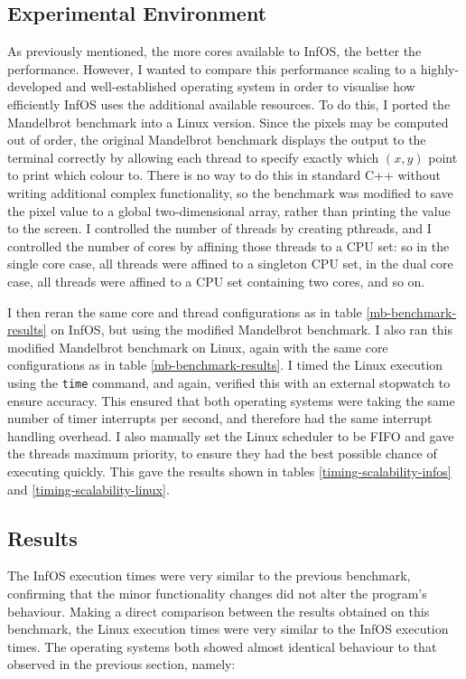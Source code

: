 \documentclass[bsc,frontabs,singlespacing,parskip,deptreport]{infthesis}
\begin{document}
\subsection{Experimental Environment} 
As previously mentioned, the more cores available to InfOS, the better the performance. However, I wanted to compare this performance scaling to a highly-developed and well-established operating system in order to visualise how efficiently InfOS uses the additional available resources. To do this, I ported the Mandelbrot benchmark into a Linux version. Since the pixels may be computed out of order, the original Mandelbrot benchmark displays the output to the terminal correctly by allowing each thread to specify exactly which $(x,y)$ point to print which colour to. There is no way to do this in standard C++ without writing additional complex functionality, so the benchmark was modified to save the pixel value to a global two-dimensional array, rather than printing the value to the screen. I controlled the number of threads by creating pthreads, and I controlled the number of cores by affining those threads to a CPU set: so in the single core case, all threads were affined to a singleton CPU set, in the dual core case, all threads were affined to a CPU set containing two cores, and so on.


I then reran the same core and thread configurations as in table \ref{mb-benchmark-results} on InfOS, but using the modified Mandelbrot benchmark. I also ran this modified Mandelbrot benchmark on Linux, again with the same core configurations as in table \ref{mb-benchmark-results}. I timed the Linux execution using the \verb|time| command, and again, verified this with an external stopwatch to ensure accuracy. This ensured that both operating systems were taking the same number of timer interrupts per second, and therefore had the same interrupt handling overhead. I also manually set the Linux scheduler to be FIFO and gave the threads maximum priority, to ensure they had the best possible chance of executing quickly. This gave the results shown in tables \ref{timing-scalability-infos} and \ref{timing-scalability-linux}.

\subsection{Results}

The InfOS execution times were very similar to the previous benchmark, confirming that the minor functionality changes did not alter the program's behaviour. Making a direct comparison between the results obtained on this benchmark, the Linux execution times were very similar to the InfOS execution times. The operating systems both showed almost identical behaviour to that observed in the previous section, namely:
\end{document}
